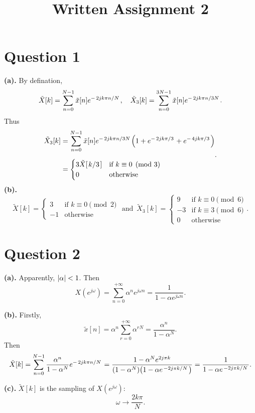 \documentclass{article}
\begin{document}
\title{Written Assignment 2}
\section*{Question 1}
\textbf{(a).}
By defination,
\[
	\begin{aligned}
			&\tilde{X}[k]=\sum_{n=0}^{N-1}\tilde{x}[n]e^{-\flatfrac{2jk\pi n}{N}}
			,\,
			&\tilde{X}_3[k]=\sum_{n=0}^{3N-1}\tilde{x}[n]e^{-\flatfrac{2jk\pi n}{3N}}
	\end{aligned}
.\]
Thus
\[
	\begin{aligned}
		\tilde{X}_3[k]
		&=
		\sum_{n=0}^{N-1}\tilde{x}[n]e^{-\flatfrac{2jk\pi n}{3N}}
		\qty(1+e^{-\flatfrac{2jk\pi}{3}}+e^{-\flatfrac{4jk\pi}{3}})
		\\[6pt]&=
		\begin{cases}
			3\tilde{X}[\flatfrac{k}{3}] &\mbox{if }k\equiv 0 \pmod{3} \\
			0 &\mbox{otherwise}
		\end{cases}
	\end{aligned}
.\]
\textbf{(b).}
\[
	\tilde{X}[k]=
	\begin{cases}
		3 &\mbox{if }k\equiv 0 \pmod{2} \\
		-1 &\mbox{otherwise}
	\end{cases}
	\mbox{ and }\,
	\tilde{X}_3[k]=
	\begin{cases}
		9 & \mbox{if } k\equiv 0 \pmod{6}\\
		-3 & \mbox{if }k\equiv 3 \pmod{6}\\
		0 &\mbox{otherwise}
	\end{cases}
.\] 

\section*{Question 2}
\textbf{(a).}
Apparently, $\qty|\alpha|<1$.
Then 
\[
	X(e^{j\omega})=\sum_{n=0}^{+\infty}\alpha^ne^{j\omega n}=\frac{1}{1-\alpha e^{j\omega n}}
.\]

\textbf{(b).}
Firstly,
\[
	\tilde{x}[n]=\alpha^n\sum_{r=0}^{+\infty}\alpha^{rN}=\frac{\alpha^n}{1-\alpha^N}
.\] 
Then
\[
	\tilde{X}[k]=
	\sum_{n=0}^{N-1}\frac{\alpha^n}{1-\alpha^N}e^{-\flatfrac{2jk\pi n}{N}}
	=
	\frac{1-\alpha^Ne^{2j\pi k}}{\qty(1-\alpha^N)\qty(1-\alpha e^{\flatfrac{-2j\pi k}{N}})}
	=
	\frac{1}{1-\alpha e^{\flatfrac{-2j\pi k}{N}}}
.\] 

\textbf{(c).}
$\tilde{X}[k]$ is the sampling of $X(e^{j\omega})$: 
\[
	\omega\to \frac{2k\pi}{N}
.\]
\end{document}
